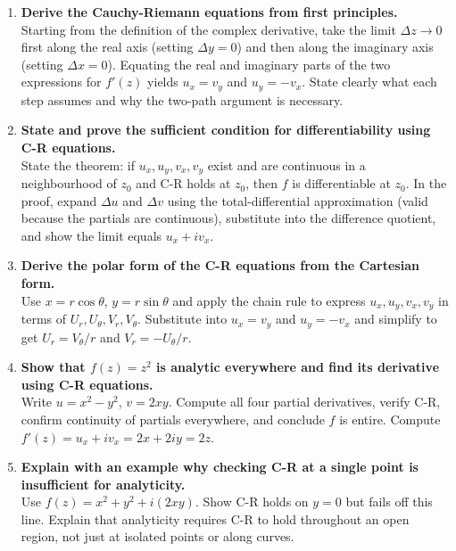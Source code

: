 \documentclass[12pt,a4paper]{article}
\begin{document}
\begin{enumerate}
  \item \textbf{Derive the Cauchy-Riemann equations from first principles.}\\
  Starting from the definition of the complex derivative, take the limit $\Delta z \to 0$ first along the real axis (setting $\Delta y = 0$) and then along the imaginary axis (setting $\Delta x = 0$). Equating the real and imaginary parts of the two expressions for $f'(z)$ yields $u_x = v_y$ and $u_y = -v_x$. State clearly what each step assumes and why the two-path argument is necessary.

  \item \textbf{State and prove the sufficient condition for differentiability using C-R equations.}\\
  State the theorem: if $u_x, u_y, v_x, v_y$ exist and are continuous in a neighbourhood of $z_0$ and C-R holds at $z_0$, then $f$ is differentiable at $z_0$. In the proof, expand $\Delta u$ and $\Delta v$ using the total-differential approximation (valid because the partials are continuous), substitute into the difference quotient, and show the limit equals $u_x + iv_x$.

  \item \textbf{Derive the polar form of the C-R equations from the Cartesian form.}\\
  Use $x = r\cos\theta$, $y = r\sin\theta$ and apply the chain rule to express $u_x, u_y, v_x, v_y$ in terms of $U_r, U_\theta, V_r, V_\theta$. Substitute into $u_x = v_y$ and $u_y = -v_x$ and simplify to get $U_r = V_\theta/r$ and $V_r = -U_\theta/r$.

  \item \textbf{Show that $f(z) = z^2$ is analytic everywhere and find its derivative using C-R equations.}\\
  Write $u = x^2-y^2$, $v = 2xy$. Compute all four partial derivatives, verify C-R, confirm continuity of partials everywhere, and conclude $f$ is entire. Compute $f'(z) = u_x + iv_x = 2x + 2iy = 2z$.

  \item \textbf{Explain with an example why checking C-R at a single point is insufficient for analyticity.}\\
  Use $f(z) = x^2+y^2+i(2xy)$. Show C-R holds on $y=0$ but fails off this line. Explain that analyticity requires C-R to hold throughout an open region, not just at isolated points or along curves.
\end{enumerate}
\end{document}
